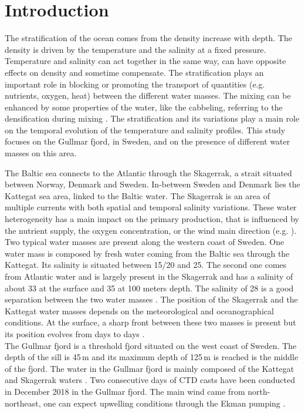 \documentclass[12pt,a4paper]{article}
\begin{document}
\section{\label{sec_intro}Introduction}

The stratification of the ocean comes from the density increase with depth.
The density is driven by the temperature and the salinity at a fixed pressure.
Temperature and salinity can act together in the same way,
can have opposite effects on density and sometime compensate.
The stratification plays an important role in blocking or
promoting the transport of quantities (e.g. nutrients, oxygen, heat)
between the different water masses.
The mixing can be enhanced by some properties of the water,
like the cabbeling, referring to the densification during mixing
\citep{klocker2010}. The stratification and its variations
play a main role on the temporal evolution of the temperature
and salinity profiles.
This study focuses on the Gullmar fjord, in Sweden, and on
the presence of different water masses on this area.


The Baltic sea connects to the Atlantic through the Skagerrak,
a strait situated between Norway, Denmark and Sweden.
In-between Sweden and Denmark lies the Kattegat sea area,
linked to the Baltic water.
The Skagerrak is an area of multiple currents with
both spatial and temporal salinity variations.
These water heterogeneity has a main impact on
the primary production, that is influenced by the nutrient
supply, the oxygen concentration, or the wind main direction (e.g.
\cite{lindhal1998,dahl1992,andersson1993}).
\\
Two typical water masses are present along the western coast of Sweden.
One water mass is composed by fresh water coming from the Baltic sea through the Kattegat.
Its salinity is situated between 15/20 and 25.
The second one comes from Atlantic water and is largely present in the Skagerrak
and has a salinity of about 33 at the surface and 35 at 100 meters depth.
The salinity of 28 is a good separation between the two
water masses \citep{arneborg2003}.
The position of the Skagerrak and the Kattegat water masses depends on
the meteorological and oceanographical conditions.
At the surface, a sharp front between these two masses is present
but its position evolves from days to days
\citep{gustafsson1996}.
\\
The Gullmar fjord is a threshold fjord situated on the west coast of Sweden.
The depth of the sill is 45\,m and its maximum depth of 125\,m is reached
is the middle of the fjord.
The water in the Gullmar fjord is mainly composed of the
Kattegat and Skagerrak waters \citep{arneborg2003}.
Two consecutive days of CTD casts have been conducted in December 2018
in the Gullmar fjord. The main wind came from north-northeast, one can
expect upwelling conditions through the Ekman pumping \citep{danielssen1997}.
\end{document}
